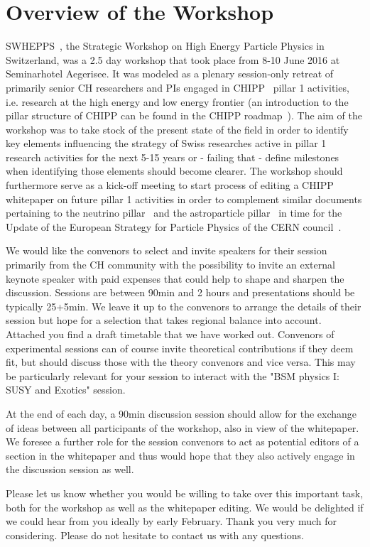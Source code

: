 \section{Overview of the Workshop}\label{Overview}



\noindent SWHEPPS~\cite{workshopindico},  the Strategic Workshop on High Energy Particle Physics in Switzerland, was a 2.5 day workshop that took place from 8-10 June 2016 at 
Seminarhotel Aegerisee.   It was  modeled as a plenary session-only retreat of primarily senior CH researchers and PIs engaged in CHIPP~\cite{chipp} pillar 1 activities, 
i.e. research at the high energy and low energy frontier (an introduction to the pillar structure of CHIPP can be found in the CHIPP roadmap~\cite{roadmap}). The aim  of the workshop
 was to take stock of the present state of the field in order to identify key elements influencing the strategy of Swiss researches active in pillar 1 research activities for the next 5-15 years or
 - failing that - define milestones when identifying those elements should become clearer. The workshop should furthermore serve as a kick-off meeting to start  process of editing a
 CHIPP whitepaper on future pillar 1 activities in order to  complement similar documents pertaining to the neutrino pillar~\cite{neutrinowhitepaper} and the astroparticle 
  pillar~\cite{astroparticlepillarwhitepaper} in time for the Update of the European Strategy for Particle Physics  of the  CERN council~\cite{europeanstrategy}. 



 


 

We would like the convenors to select and invite speakers for their session primarily from the CH community with the possibility to invite an external keynote speaker with paid expenses that could help to shape and sharpen the discussion.  Sessions are between 90min and 2 hours and presentations should be typically 25+5min. We leave it up to the convenors to arrange the details of their session but hope for a selection that takes regional balance into account. Attached you find a draft timetable that we have worked out. Convenors of experimental sessions can of course invite theoretical contributions if they deem fit, but should discuss those with the theory convenors and vice versa. This may be particularly relevant for your session to interact with
the "BSM physics I: SUSY and Exotics" session.

 

 At the end of each day, a 90min discussion session should allow for the exchange of ideas between all participants of the workshop, also  in view of the whitepaper.   We foresee a further role for the session convenors to act as potential editors of a section in the whitepaper and thus would hope that they also actively engage in the discussion session as well. 

 

Please let us know whether you would be willing to take over this important task, both for the workshop as well as the whitepaper editing. We would be delighted if we could hear from you ideally by early February.  Thank you very much for considering. Please do not hesitate to contact us with any questions. 